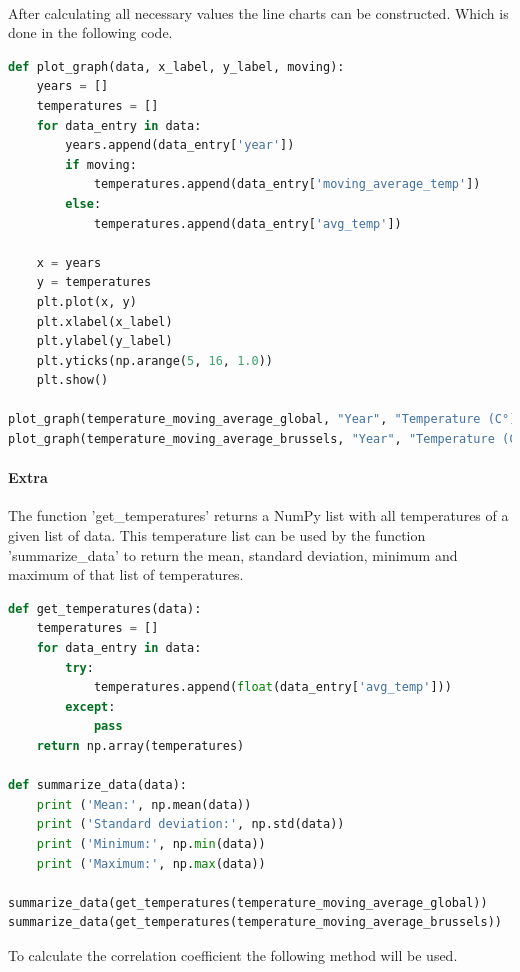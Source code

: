 \documentclass{article}
\begin{document}
\paragraph{}
After calculating all necessary values the line charts can be constructed. Which is done in the following code.
\begin{lstlisting}[language=Python]
def plot_graph(data, x_label, y_label, moving):
	years = []
	temperatures = []
	for data_entry in data:
		years.append(data_entry['year'])
		if moving:
			temperatures.append(data_entry['moving_average_temp'])
		else:
			temperatures.append(data_entry['avg_temp'])

	x = years
	y = temperatures
	plt.plot(x, y)
	plt.xlabel(x_label)
	plt.ylabel(y_label)
	plt.yticks(np.arange(5, 16, 1.0))
	plt.show()

plot_graph(temperature_moving_average_global, "Year", "Temperature (C°)", True)
plot_graph(temperature_moving_average_brussels, "Year", "Temperature (C°)", True)
\end{lstlisting}

\paragraph{Extra}
The function 'get\_temperatures' returns a NumPy list with all temperatures of a given list of data. This temperature list can be used by the function 'summarize\_data' to return the mean, standard deviation, minimum and maximum of that list of temperatures.
\begin{lstlisting}[language=Python]
def get_temperatures(data):
	temperatures = []
	for data_entry in data:
		try:
			temperatures.append(float(data_entry['avg_temp']))
		except:
			pass
	return np.array(temperatures)

def summarize_data(data):
	print ('Mean:', np.mean(data))
	print ('Standard deviation:', np.std(data))
	print ('Minimum:', np.min(data))
	print ('Maximum:', np.max(data))

summarize_data(get_temperatures(temperature_moving_average_global))
summarize_data(get_temperatures(temperature_moving_average_brussels))
\end{lstlisting}

To calculate the correlation coefficient the following method will be used.
\end{document}
